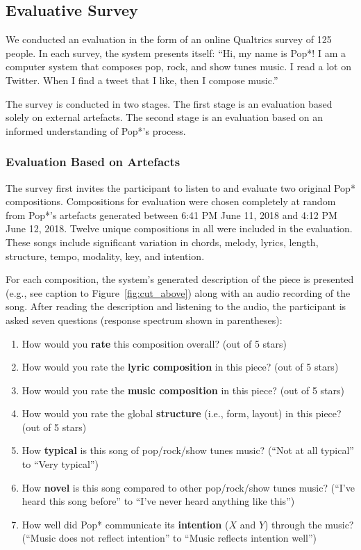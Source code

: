 \documentclass[phd,electronic,oneside,twosidetoc,letterpaper,chaptercenter,parttop,lol,lof,lot]{byumsphd}
\begin{document}
\subsection{Evaluative Survey}

We conducted an evaluation in the form of an online Qualtrics survey of 125 people. In each survey, the system presents itself: ``Hi, my name is Pop*! I am a computer system that composes pop, rock, and show tunes music. I read a lot on Twitter. When I find a tweet that I like, then I compose music.''

The survey is conducted in two stages. The first stage is an evaluation based solely on external artefacts. The second stage is an evaluation based on an informed understanding of Pop*'s process. 

\subsubsection{Evaluation Based on Artefacts} The survey first invites the participant to listen to and evaluate two original Pop* compositions. Compositions for evaluation were chosen completely at random from Pop*'s artefacts generated between 6:41 PM June 11, 2018 and 4:12 PM June 12, 2018. Twelve unique compositions in all were included in the evaluation. These songs include significant variation in chords, melody, lyrics, length, structure, tempo, modality, key, and intention. 

For each composition, the system's generated description of the piece is presented (e.g., see caption to Figure~\ref{fig:cut_above}) along with an audio recording of the song. After reading the description and listening to the audio, the participant is asked seven questions (response spectrum shown in parentheses):

\begin{enumerate}
\item How would you \textbf{rate} this composition overall? (out of 5 stars)
\item How would you rate the \textbf{lyric composition} in this piece? (out of 5 stars)
\item How would you rate the \textbf{music composition} in this piece? (out of 5 stars)
\item How would you rate the global \textbf{structure} (i.e., form, layout) in this piece? (out of 5 stars)
\item How \textbf{typical} is this song of pop/rock/show tunes music? (``Not at all typical'' to ``Very typical'')
\item How \textbf{novel} is this song compared to other pop/rock/show tunes music? (``I've heard this song before'' to ``I've never heard anything like this'')
\item How well did Pop* communicate its \textbf{intention} ($X$ and $Y$) through the music? (``Music does not reflect intention'' to ``Music reflects intention well'')
\end{enumerate}
\end{document}
